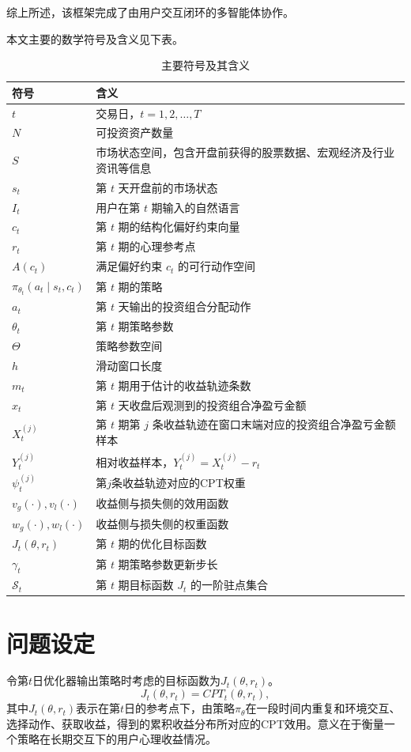 综上所述，该框架完成了由用户交互闭环的多智能体协作。


本文主要的数学符号及含义见下表。
\begin{table}[H]
\centering
\caption{主要符号及其含义}
\begin{tabular}{p{} p{}}
\hline
符号 & 含义 \\
\hline
$t$ & 交易日，$t=1,2,\dots,T$ \\
$N$ & 可投资资产数量 \\
$S$ & 市场状态空间，包含开盘前获得的股票数据、宏观经济及行业资讯等信息 \\
$s_t$ & 第 $t$ 天开盘前的市场状态 \\
$I_t$ & 用户在第 $t$ 期输入的自然语言 \\
$c_t$ & 第 $t$ 期的结构化偏好约束向量 \\
$r_t$ & 第 $t$ 期的心理参考点 \\
$A(c_t)$ & 满足偏好约束 $c_t$ 的可行动作空间 \\
$\pi_{\theta_t}(a_t\mid s_t,c_t)$ & 第 $t$ 期的策略 \\
$a_t$ & 第 $t$ 天输出的投资组合分配动作 \\
$\theta_t$ & 第 $t$ 期策略参数 \\
$\Theta$ & 策略参数空间 \\
$h$ & 滑动窗口长度 \\
$m_t$ & 第 $t$ 期用于估计的收益轨迹条数 \\
$x_t$ & 第 $t$ 天收盘后观测到的投资组合净盈亏金额 \\
$X_t^{(j)}$ & 第 $t$ 期第 $j$ 条收益轨迹在窗口末端对应的投资组合净盈亏金额样本 \\
$Y_t^{(j)}$ & 相对收益样本，$Y_t^{(j)}=X_t^{(j)}-r_t$ \\
$\psi_t^{(j)}$ & 第$j$条收益轨迹对应的CPT权重 \\
$v_g(\cdot),v_l(\cdot)$ & 收益侧与损失侧的效用函数 \\
$w_g(\cdot),w_l(\cdot)$ & 收益侧与损失侧的权重函数 \\
$J_t(\theta,r_t)$ & 第 $t$ 期的优化目标函数 \\
$\gamma_t$ & 第 $t$ 期策略参数更新步长 \\
$\mathcal{S}_t$ & 第 $t$ 期目标函数 $J_t$ 的一阶驻点集合 \\
\hline
\end{tabular}
\end{table}
\section{问题设定}
令第$t$日优化器输出策略时考虑的目标函数为$J_t(\theta,r_t)$。
\begin{equation}
J_t(\theta,r_t)=CPT_t(\theta,r_t),
\end{equation}
其中$J_t(\theta,r_t)$表示在第$t$日的参考点下，由策略$\pi_{\theta}$在一段时间内重复和环境交互、选择动作、获取收益，得到的累积收益分布所对应的CPT效用。意义在于衡量一个策略在长期交互下的用户心理收益情况。

